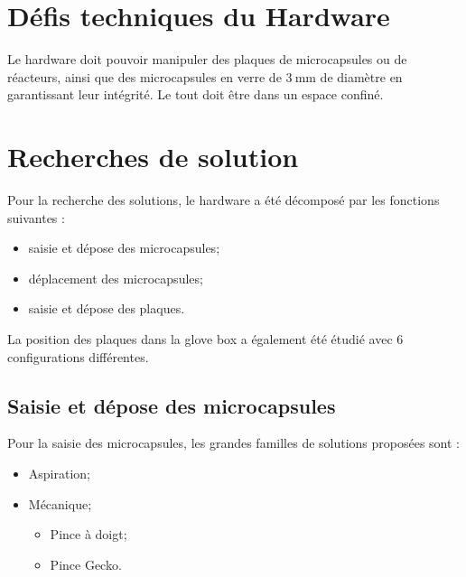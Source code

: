 \section{Défis techniques du Hardware}
Le hardware doit pouvoir manipuler des plaques de microcapsules ou de réacteurs, ainsi que des microcapsules en verre de $\qty{3}{\mm}$ de diamètre en garantissant leur intégrité. Le tout doit être dans un espace confiné.
\section{Recherches de solution}
Pour la recherche des solutions, le hardware a été décomposé par les fonctions suivantes : 
\begin{itemize}
    \item saisie et dépose des microcapsules;
    \item déplacement des microcapsules;
    \item saisie et dépose des plaques.
\end{itemize} 
La position des plaques dans la glove box a également été étudié avec $6$ configurations différentes.
\subsection{Saisie et dépose des microcapsules}
Pour la saisie des microcapsules, les grandes familles de solutions proposées sont : 
\begin{itemize}
    \item Aspiration;
    \item Mécanique; \begin{itemize}
        \item Pince à doigt;
        \item Pince Gecko.
    \end{itemize}
\end{itemize}
